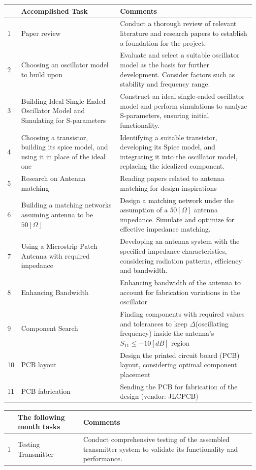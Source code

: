 \documentclass[]{extarticle}
\begin{document}
\begin{tabular}{|p{0.4cm}|p{4cm}|p{11cm}|}
    \hline
    & \textbf{Accomplished Task} & \textbf{Comments}\\
    \hline
    1 & Paper review & Conduct a thorough review of relevant literature and research papers to establish a foundation for the project.  \\
    \hline
    2 & Choosing an oscillator model to build upon & Evaluate and select a suitable oscillator model as the basis for further development. Consider factors such as stability and frequency range.  \\
    \hline
    3 & Building Ideal Single-Ended Oscillator Model and Simulating for S-parameters & Construct an ideal single-ended oscillator model and perform simulations to analyze S-parameters, ensuring initial functionality.  \\
    \hline
    4 & Choosing a transistor, building its spice model, and using it in place of the ideal one & Identifying a suitable transistor, developing its Spice model, and integrating it into the oscillator model, replacing the idealized component. \\
    \hline
    5 & Research on Antenna matching  & Reading papers related to antenna matching for design inspirations\\
    \hline
    6 & Building a matching networks assuming antenna to be \(50[\Omega]\) & Design a matching network under the assumption of a \(50[\Omega]\) antenna impedance. Simulate and optimize for effective impedance matching.  \\
    \hline
    7 & Using a Microstrip Patch Antenna with required impedance & Developing an antenna system with the specified impedance characteristics, considering radiation patterns, efficiency and bandwidth. \\
    \hline
    8 & Enhancing Bandwidth & Enhancing bandwidth of the antenna to account for fabrication variations in the oscillator\\
    \hline
    9 & Component Search & Finding components with required values and tolerances to keep \(\Delta\)(oscillating frequency) inside the antenna's \(S_{11}\le -10[dB]\) region\\
    \hline
    10 & PCB layout & Design the printed circuit board (PCB) layout, considering optimal component placement\\
    \hline
    11 & PCB fabrication& Sending the PCB for fabrication of the design (vendor: JLCPCB)\\
    \hline
\end{tabular}

\vspace{2cm}

\begin{tabular}{|p{0.4cm}|p{4cm}|p{11cm}|}
     \hline
    & \textbf{The following month tasks} & \textbf{Comments}\\
    \hline
    1 & Testing Transmitter & Conduct comprehensive testing of the assembled transmitter system to validate its functionality and performance.\\
    \hline
\end{tabular}
\end{document}
